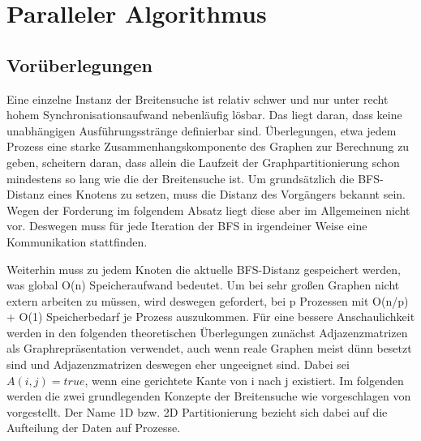\chapter{Paralleler Algorithmus} %
\label{cha:paralleler_algorithmus}

\section{Vorüberlegungen} %
\label{sec:vor_berlegungen}
Eine einzelne Instanz der Breitensuche ist relativ schwer und nur unter recht hohem Synchronisationsaufwand nebenläufig lösbar. Das liegt daran, dass keine unabhängigen Ausführungsstränge definierbar sind. Überlegungen, etwa jedem Prozess eine starke Zusammenhangskomponente des Graphen zur Berechnung zu geben, scheitern daran, dass allein die Laufzeit der Graphpartitionierung schon mindestens so lang wie die der Breitensuche ist. Um grundsätzlich die BFS-Distanz eines Knotens zu setzen, muss die Distanz des Vorgängers bekannt sein. Wegen der Forderung im folgendem Absatz liegt diese aber im Allgemeinen nicht vor. Deswegen muss für jede Iteration der BFS in irgendeiner Weise eine Kommunikation stattfinden.

Weiterhin muss zu jedem Knoten die aktuelle BFS-Distanz gespeichert werden, was global O(n) Speicheraufwand bedeutet. Um bei sehr großen Graphen nicht extern arbeiten zu müssen, wird deswegen gefordert, bei p Prozessen mit O(n/p) + O(1) Speicherbedarf je Prozess auszukommen. Für eine bessere Anschaulichkeit werden in den folgenden theoretischen Überlegungen zunächst Adjazenzmatrizen als Graphrepräsentation verwendet, auch wenn reale Graphen meist dünn besetzt sind und Adjazenzmatrizen deswegen eher ungeeignet sind. Dabei sei $A(i,j) = true$, wenn eine gerichtete Kante von i nach j existiert. Im folgenden werden die zwei grundlegenden Konzepte der Breitensuche wie vorgeschlagen von \cite{Buluc:2011} vorgestellt. Der Name 1D bzw. 2D Partitionierung bezieht sich dabei auf die Aufteilung der Daten auf Prozesse.


